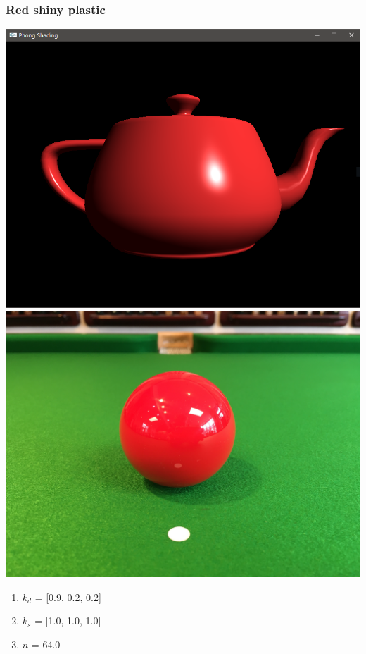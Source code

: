 \documentclass{beamer}
\begin{document}
\begin{frame}
    \frametitle{Red shiny plastic}

    \begin{center}
        \includegraphics[scale=0.15]{q5-red.png}
        \includegraphics[scale=0.03]{red-billiard.jpg}
    \end{center}

    \begin{enumerate}
        \item $k_d$ = [0.9, 0.2, 0.2]
        \item $k_s$ = [1.0, 1.0, 1.0]
        \item $n$ = 64.0
    \end{enumerate}

\end{frame}
\end{document}
